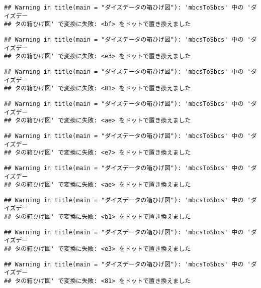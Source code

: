 \documentclass[
]{article}
\begin{document}
\begin{verbatim}
## Warning in title(main = "ダイズデータの箱ひげ図"): 'mbcsToSbcs' 中の 'ダイズデー
## タの箱ひげ図' で変換に失敗: <bf> をドットで置き換えました
\end{verbatim}

\begin{verbatim}
## Warning in title(main = "ダイズデータの箱ひげ図"): 'mbcsToSbcs' 中の 'ダイズデー
## タの箱ひげ図' で変換に失敗: <e3> をドットで置き換えました
\end{verbatim}

\begin{verbatim}
## Warning in title(main = "ダイズデータの箱ひげ図"): 'mbcsToSbcs' 中の 'ダイズデー
## タの箱ひげ図' で変換に失敗: <81> をドットで置き換えました
\end{verbatim}

\begin{verbatim}
## Warning in title(main = "ダイズデータの箱ひげ図"): 'mbcsToSbcs' 中の 'ダイズデー
## タの箱ひげ図' で変換に失敗: <ae> をドットで置き換えました
\end{verbatim}

\begin{verbatim}
## Warning in title(main = "ダイズデータの箱ひげ図"): 'mbcsToSbcs' 中の 'ダイズデー
## タの箱ひげ図' で変換に失敗: <e7> をドットで置き換えました
\end{verbatim}

\begin{verbatim}
## Warning in title(main = "ダイズデータの箱ひげ図"): 'mbcsToSbcs' 中の 'ダイズデー
## タの箱ひげ図' で変換に失敗: <ae> をドットで置き換えました
\end{verbatim}

\begin{verbatim}
## Warning in title(main = "ダイズデータの箱ひげ図"): 'mbcsToSbcs' 中の 'ダイズデー
## タの箱ひげ図' で変換に失敗: <b1> をドットで置き換えました
\end{verbatim}

\begin{verbatim}
## Warning in title(main = "ダイズデータの箱ひげ図"): 'mbcsToSbcs' 中の 'ダイズデー
## タの箱ひげ図' で変換に失敗: <e3> をドットで置き換えました
\end{verbatim}

\begin{verbatim}
## Warning in title(main = "ダイズデータの箱ひげ図"): 'mbcsToSbcs' 中の 'ダイズデー
## タの箱ひげ図' で変換に失敗: <81> をドットで置き換えました
\end{verbatim}
\end{document}
